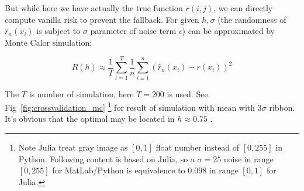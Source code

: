 \documentclass{article}
\begin{document}
But while here we have actually the true function $r(i,j)$, 
we can directly compute vanilla risk to prevent the fallback.
For given $h,\sigma$ (the randomness of $\hat{r}_n(x_i)$ is subject to $\sigma$ parameter of noise term $\epsilon$) 
can be approximated by Monte Calor simulation:

$$
R(h) \approx \frac{1}{T} \sum_{t=1}^T \frac{1}{n}\sum_{i=1}^n(\hat{r}_n(x_i)-r(x_i))^2
$$

The $T$ is number of simulation, here $T=200$ is used. See Fig~\ref{fig:crossvalidation_mc}
\footnote{Note Julia treat gray image as $[0,1]$ float number instead of $[0,255]$ in Python. Following content is based on Julia,
so a $\sigma=25$ noise in range $[0,255]$ for MatLab/Python is equivalence to $0.098$ in range $[0,1]$ for Julia.}
 for result of simulation with mean with $3\sigma$ ribbon. 
It's obvious that the optimal may be located in $h \approx 0.75$ .
\end{document}
